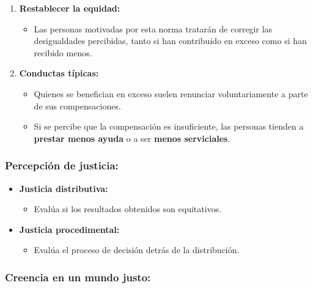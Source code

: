 \documentclass[
]{book}
\providecommand{\tightlist}{%
  \setlength{\itemsep}{0pt}\setlength{\parskip}{0pt}}
\begin{document}
\begin{enumerate}
\def\labelenumi{\arabic{enumi}.}
\tightlist
\item
  \textbf{Restablecer la equidad:}

  \begin{itemize}
  \tightlist
  \item
    Las personas motivadas por esta norma tratarán de corregir las desigualdades percibidas, tanto si han contribuido en exceso como si han recibido menos.
  \end{itemize}
\item
  \textbf{Conductas típicas:}

  \begin{itemize}
  \tightlist
  \item
    Quienes se benefician en exceso suelen renunciar voluntariamente a parte de sus compensaciones.
  \item
    Si se percibe que la compensación es insuficiente, las personas tienden a \textbf{prestar menos ayuda} o a ser \textbf{menos serviciales}.
  \end{itemize}
\end{enumerate}

\subsubsection{Percepción de justicia:}\label{percepciuxf3n-de-justicia}

\begin{itemize}
\tightlist
\item
  \textbf{Justicia distributiva:}

  \begin{itemize}
  \tightlist
  \item
    Evalúa si los resultados obtenidos son equitativos.\\
  \end{itemize}
\item
  \textbf{Justicia procedimental:}

  \begin{itemize}
  \tightlist
  \item
    Evalúa el proceso de decisión detrás de la distribución.
  \end{itemize}
\end{itemize}

\subsubsection{Creencia en un mundo justo:}\label{creencia-en-un-mundo-justo}
\end{document}
